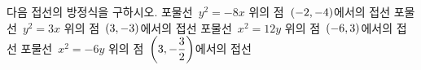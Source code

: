 다음 접선의 방정식을 구하시오.
 포물선~$y^2=-8x$ 위의 점~$(-2{,}\mkern3mu\mathopen{}-4)$에서의 접선
 포물선~$y^2=3x$ 위의 점~$(3{,}\mkern3mu\mathopen{}-3)$에서의 접선
 포물선~$x^2=12y$ 위의 점~$(-6{,}\mkern3mu\mathopen{}3)$에서의 접선
 포물선~$x^2=-6y$ 위의 점~$\left(3{,}\mkern3mu\mathopen{}-\dfrac{3}{2}\right)$에서의 접선
